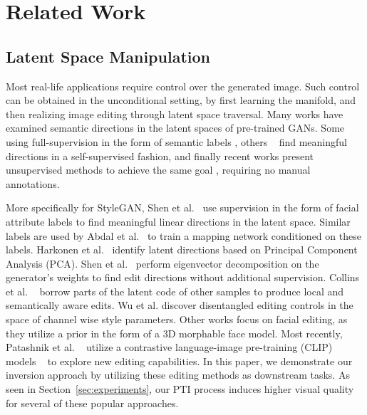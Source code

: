 \section{Related Work}

\subsection{Latent Space Manipulation}

Most real-life applications require control over the generated image. Such control can be obtained in the unconditional setting, by first learning the manifold, and then realizing image editing through latent space traversal. Many works have examined semantic directions in the latent spaces of pre-trained GANs. Some using full-supervision in the form of semantic labels \cite{denton2019detecting, goetschalckx2019ganalyze, shen2020interpreting}, others ~\cite{jahanian2019steerability, spingarn2020gan, plumerault2020controlling} find meaningful directions in a self-supervised fashion, and finally recent works present unsupervised methods to achieve the same goal \cite{voynov2020unsupervised, harkonen2020ganspace, wang2021a}, requiring no manual annotations. 

More specifically for StyleGAN, Shen et al.~\cite{shen2020interpreting} use supervision in the form of facial attribute labels to find meaningful linear directions in the latent space. Similar labels are used by Abdal et al.~\cite{abdal2020styleflow} to train a mapping network conditioned on these labels. Harkonen et al.~\cite{harkonen2020ganspace} identify latent directions based on Principal Component Analysis (PCA). Shen et al.~\cite{shen2020closedform} perform eigenvector decomposition on the generator’s weights to find edit directions without additional supervision. Collins et al. ~\cite{collins2020editing} borrow parts of the latent code of other samples to produce local and semantically aware edits.  Wu et al. \cite{wu2020stylespace} discover disentangled editing controls in the space of channel wise style parameters. Other works \cite{tewari2020pie, tewari2020stylerig} focus on facial editing, as they utilize a prior in the form of a 3D morphable face model. Most recently, Patashnik et al. ~\cite{patashnik2021styleclip} utilize a contrastive language-image pre-training (CLIP) models ~\cite{radford2021learning} to explore new editing capabilities. In this paper, we demonstrate our inversion approach by utilizing these editing methods as downstream tasks. As seen in Section~\ref{sec:experiments}, our PTI process induces higher visual quality for several of these popular approaches.

